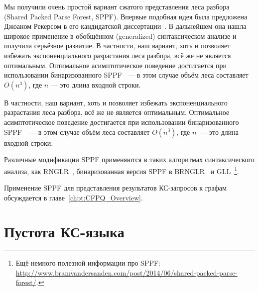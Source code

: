 \begin{example}
\begin{center}
{
}
\end{center}


\end{example}


Мы получили очень простой вариант сжатого представления леса разбора (Shared Packed Parse Forest, SPPF).
Впервые подобная идея была предложена Джоаном Рекерсом в его кандидатской диссертации~\cite{SPPF}.
В дальнейшем она нашла широкое применение в обобщённом (generalized) синтаксическом анализе и получила серьёзное развитие.
В частности, наш вариант, хоть и позволяет избежать экспоненциального разрастания леса разбора, всё же не является оптимальным.
Оптимальное асимптотическое поведение достигается при использовании бинаризованного SPPF~\cite{Billot:1989:SSF:981623.981641} --- в этом случае объём леса составляет $O(n^3)$, где $n$ --- это длина входной строки.


В частности, наш вариант, хоть и позволяет избежать экспоненциального разрастания леса разбора, всё же не является оптимальным.
Оптимальное асимптотическое поведение достигается при использовании бинаризованного SPPF~~--- в этом случае объём леса составляет $O(n^3)$, где $n$~--- это длина входной строки.

Различные модификации SPPF применяются в таких алгоритмах синтаксического анализа, как RNGLR~, бинаризованная версия SPPF в BRNGLR~ и GLL~\footnote{Ещё немного полезной информации про SPPF: \url{http://www.bramvandersanden.com/post/2014/06/shared-packed-parse-forest/}.}.

Применение SPPF для представления результатов КС-запросов к графам обсуждается в главе~\ref{chpt:CFPQ_Overview}.

\section{Пустота КС-языка}

